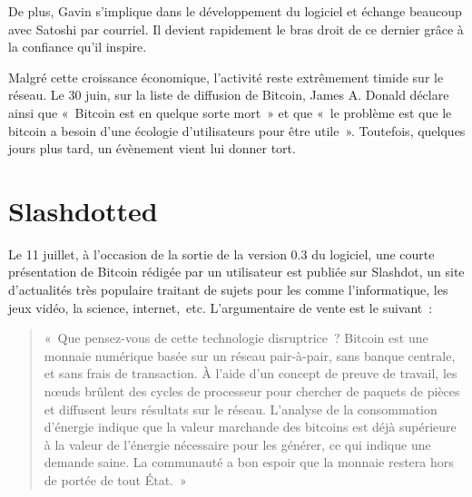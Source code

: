 De plus, Gavin s'implique dans le développement du logiciel et échange beaucoup avec Satoshi par courriel. Il devient rapidement le bras droit de ce dernier grâce à la confiance qu'il inspire.

Malgré cette croissance économique, l'activité reste extrêmement timide sur le réseau. Le 30 juin, sur la liste de diffusion de Bitcoin, James A. Donald déclare ainsi que «~Bitcoin est en quelque sorte mort~» et que «~le problème est que le bitcoin a besoin d'une écologie d'utilisateurs pour être utile~». Toutefois, quelques jours plus tard, un évènement vient lui donner tort.

\section{Slashdotted}

Le 11 juillet, à l'occasion de la sortie de la version 0.3 du logiciel, une courte présentation de Bitcoin rédigée par un utilisateur est publiée sur Slashdot, un site d'actualités très populaire traitant de sujets pour les  comme l'informatique, les jeux vidéo, la science, internet,~etc. L'argumentaire de vente est le suivant~:

\begin{quote}
«~Que pensez-vous de cette technologie disruptrice~? Bitcoin est une monnaie numérique basée sur un réseau pair-à-pair, sans banque centrale, et sans frais de transaction. À l'aide d'un concept de preuve de travail, les nœuds brûlent des cycles de processeur pour chercher de paquets de pièces et diffusent leurs résultats sur le réseau. L'analyse de la consommation d'énergie indique que la valeur marchande des bitcoins est déjà supérieure à la valeur de l'énergie nécessaire pour les générer, ce qui indique une demande saine. La communauté a bon espoir que la monnaie restera hors de portée de tout État.~»
\end{quote}


